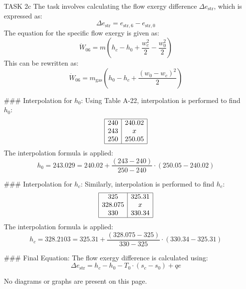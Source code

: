 TASK 2c  
The task involves calculating the flow exergy difference \( \Delta e_{\text{str}} \), which is expressed as:  
\[
\Delta e_{\text{str}} = e_{\text{str},6} - e_{\text{str},0}
\]  
The equation for the specific flow exergy is given as:  
\[
\dot{W}_{06} = m \left( h_c - h_0 + \frac{w_c^2}{2} - \frac{w_0^2}{2} \right)
\]  
This can be rewritten as:  
\[
\dot{W}_{06} = m_{\text{gas}} \left( h_0 - h_c + \frac{(w_0 - w_c)^2}{2} \right)
\]  

### Interpolation for \( h_0 \):  
Using Table A-22, interpolation is performed to find \( h_0 \):  
\[
\begin{array}{|c|c|}
\hline
240 & 240.02 \\
243 & x \\
250 & 250.05 \\
\hline
\end{array}
\]  
The interpolation formula is applied:  
\[
h_0 = 243.029 = 240.02 + \frac{(243 - 240)}{250 - 240} \cdot (250.05 - 240.02)
\]  

### Interpolation for \( h_c \):  
Similarly, interpolation is performed to find \( h_c \):  
\[
\begin{array}{|c|c|}
\hline
325 & 325.31 \\
328.075 & x \\
330 & 330.34 \\
\hline
\end{array}
\]  
The interpolation formula is applied:  
\[
h_c = 328.2103 = 325.31 + \frac{(328.075 - 325)}{330 - 325} \cdot (330.34 - 325.31)
\]  

### Final Equation:  
The flow exergy difference is calculated using:  
\[
\Delta e_{\text{str}} = h_c - h_0 - T_0 \cdot (s_c - s_0) + qe
\]  

No diagrams or graphs are present on this page.
